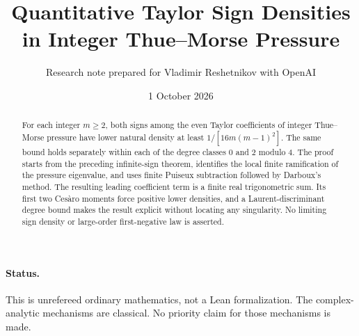 \documentclass[11pt,a4paper]{article}
\title{Quantitative Taylor Sign Densities\\in Integer Thue--Morse Pressure}
\author{Research note prepared for Vladimir Reshetnikov with OpenAI}
\date{1 October 2026}
\theoremstyle{remark}\newtheorem*{ednote}{Editorial note (ProveIt, 2026-10-01)}
\begin{document}
\maketitle
\begin{abstract}
For each integer $m\ge2$, both signs among the even Taylor coefficients of integer Thue--Morse pressure have lower natural density at least $1/[16m(m-1)^2]$. The same bound holds separately within each of the degree classes $0$ and $2$ modulo $4$. The proof starts from the preceding infinite-sign theorem, identifies the local finite ramification of the pressure eigenvalue, and uses finite Puiseux subtraction followed by Darboux's method. The resulting leading coefficient term is a finite real trigonometric sum. Its first two Ces\`aro moments force positive lower densities, and a Laurent-discriminant degree bound makes the result explicit without locating any singularity. No limiting sign density or large-order first-negative law is asserted.
\end{abstract}
\paragraph{Status.} This is unrefereed ordinary mathematics, not a Lean formalization. The complex-analytic mechanisms are classical. No priority claim for those mechanisms is made.
\end{document}
